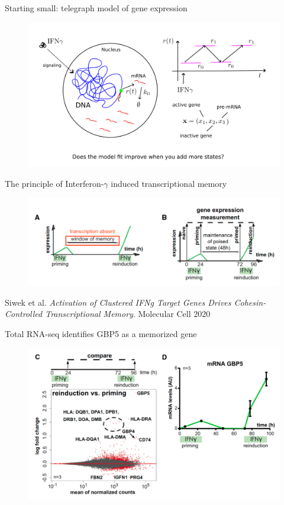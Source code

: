 \documentclass[aspectratio=1610]{beamer}					%
\begin{document}
\begin{frame}{Starting small: telegraph model of gene expression}
\begin{figure}
\includegraphics[width=14cm]{RNAFlow-2.png}
\end{figure}
\end{frame}



\begin{frame}{The principle of Interferon-$\gamma$ induced transcriptional memory}
\begin{figure}
\includegraphics[width=14cm]{figure-1.png}
\caption{}
\end{figure}

Siwek et al. \textit{Activation of Clustered IFNg Target Genes Drives Cohesin-Controlled Transcriptional Memory}. Molecular Cell 2020

\end{frame}


\begin{frame}{Total RNA-seq identifies GBP5 as a memorized gene}
\begin{figure}
\includegraphics[width=13cm]{figure-2.png}
\end{figure}

\end{frame}
\end{document}

